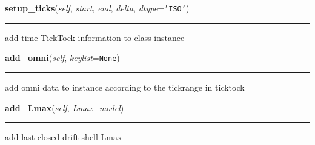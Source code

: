     \label{spacepy:radbelt:RBmodel:setup_ticks}

    \vspace{0.5ex}

\hspace{.8\funcindent}\begin{boxedminipage}{\funcwidth}

    \raggedright \textbf{setup\_ticks}(\textit{self}, \textit{start}, \textit{end}, \textit{delta}, \textit{dtype}={\tt \texttt{'}\texttt{ISO}\texttt{'}})

    \vspace{-1.5ex}

    \rule{\textwidth}{0.5\fboxrule}
\setlength{\parskip}{2ex}
    add time TickTock information to class instance

\setlength{\parskip}{1ex}
    \end{boxedminipage}

    \label{spacepy:radbelt:RBmodel:add_omni}

    \vspace{0.5ex}

\hspace{.8\funcindent}\begin{boxedminipage}{\funcwidth}

    \raggedright \textbf{add\_omni}(\textit{self}, \textit{keylist}={\tt None})

    \vspace{-1.5ex}

    \rule{\textwidth}{0.5\fboxrule}
\setlength{\parskip}{2ex}
    add omni data to instance according to the tickrange in ticktock

\setlength{\parskip}{1ex}
    \end{boxedminipage}

    \label{spacepy:radbelt:RBmodel:add_Lmax}

    \vspace{0.5ex}

\hspace{.8\funcindent}\begin{boxedminipage}{\funcwidth}

    \raggedright \textbf{add\_Lmax}(\textit{self}, \textit{Lmax\_model})

    \vspace{-1.5ex}

    \rule{\textwidth}{0.5\fboxrule}
\setlength{\parskip}{2ex}
    add last closed drift shell Lmax

\setlength{\parskip}{1ex}
    \end{boxedminipage}

